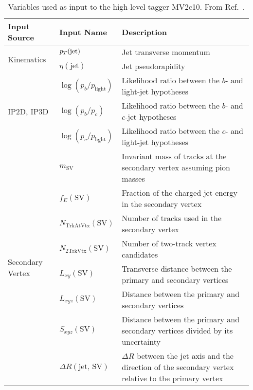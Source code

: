 \begin{table}[!htb]
    \caption{
        Variables used as input to the high-level tagger MV2c10.
        From Ref.~\cite{ATL-PHYS-PUB-2015-022}.
    }
    \label{tab:egamma_lh_inputs}
    \begin{scriptsize}
    \begin{center}
    \begin{tabularx}{\textwidth}{|X|l|X|}
    \hline
    \hline
    \textbf{Input Source} & \textbf{Input Name} & \textbf{Description} \\
    \hline
    \multirow{2}{*}{Kinematics} & $p_{T}(\text{jet})$ & Jet transverse momentum \\
    \cline{2-3}
                & $\eta(\text{jet})$ & Jet pseudorapidity \\
    \hline
    \multirow{3}{*}{IP2D, IP3D} & $\log(p_b/p_{\text{light}})$ & Likelihood ratio between the $b$- and light-jet hypotheses \\
    \cline{2-3}
                & $\log(p_b / p_c)$ & Likelihood ratio between the $b$- and $c$-jet hypotheses \\
    \cline{2-3}
                & $\log(p_c / p_{\text{light}})$ & Likelihood ratio between the $c$- and light-jet hypotheses \\
    \hline
    \multirow{8}{*}{Secondary Vertex} & $m_{\text{SV}}$ & Invariant mass of tracks at the secondary vertex assuming pion masses \\
    \cline{2-3}
            & $f_E(\text{SV})$ & Fraction of the charged jet energy in the secondary vertex \\
    \cline{2-3}
            & $N_{\text{TrkAtVtx}}(\text{SV})$ & Number of tracks used in the secondary vertex \\
    \cline{2-3}
            & $N_{\text{2TrkVtx}}(\text{SV})$ & Number of two-track vertex candidates \\
    \cline{2-3}
            & $L_{xy}(\text{SV})$ & Transverse distance between the primary and secondary vertices \\
    \cline{2-3}
            & $L_{xyz}(\text{SV})$ & Distance between the primary and secondary vertices \\
    \cline{2-3}
            & $S_{xyz}(\text{SV})$ & Distance between the primary and secondary vertices divided by its uncertainty \\
    \cline{2-3}
            & $\Delta R(\text{jet, SV})$ & $\Delta R$ between the jet axis and the direction of the secondary vertex relative to the primary vertex \\

\end{tabularx}
\end{center}
\end{scriptsize}
\end{table}
